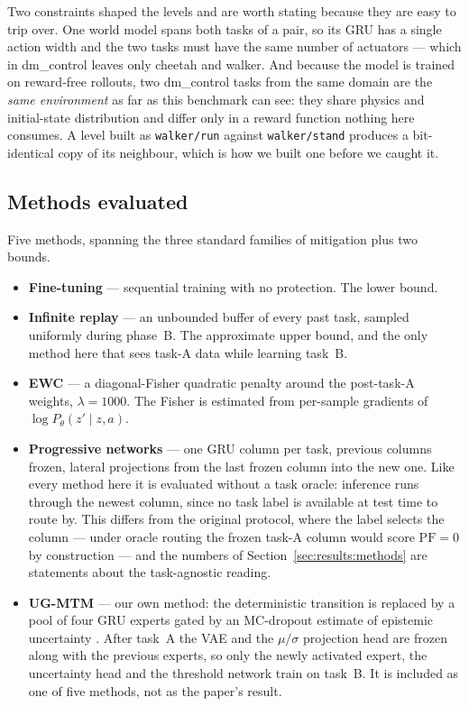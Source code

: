 Two constraints shaped the levels and are worth stating because they are easy to
trip over. One world model spans both tasks of a pair, so its GRU has a single
action width and the two tasks must have the same number of actuators --- which
in dm\_control leaves only cheetah and walker. And because the model is trained
on reward-free rollouts, two dm\_control tasks from the same domain are the
\emph{same environment} as far as this benchmark can see: they share physics and
initial-state distribution and differ only in a reward function nothing here
consumes. A level built as \texttt{walker/run} against \texttt{walker/stand}
produces a bit-identical copy of its neighbour, which is how we built one before
we caught it.

\subsection{Methods evaluated}
\label{sec:method:methods}

Five methods, spanning the three standard families of mitigation plus two
bounds.

\begin{itemize}
  \item \textbf{Fine-tuning} --- sequential training with no protection. The
  lower bound.
  \item \textbf{Infinite replay} --- an unbounded buffer of every past task,
  sampled uniformly during phase~B. The approximate upper bound, and the only
  method here that sees task-A data while learning task~B.
  \item \textbf{EWC} \citep{kirkpatrick2017ewc} --- a diagonal-Fisher quadratic
  penalty around the post-task-A weights, $\lambda = 1000$. The Fisher is
  estimated from per-sample gradients of $\log P_\theta(z' \mid z, a)$.
  \item \textbf{Progressive networks} \citep{rusu2016progressive} --- one GRU
  column per task, previous columns frozen, lateral projections from the last
  frozen column into the new one. Like every method here it is evaluated
  without a task oracle: inference runs through the newest column, since no
  task label is available at test time to route by. This differs from the
  original protocol, where the label selects the column --- under oracle
  routing the frozen task-A column would score $\mathrm{PF} = 0$ by
  construction --- and the numbers of
  Section~\ref{sec:results:methods} are statements about the task-agnostic
  reading.
  \item \textbf{UG-MTM} --- our own method: the deterministic transition is
  replaced by a pool of four GRU experts \citep{shazeer2017moe} gated by an
  MC-dropout estimate of epistemic uncertainty \citep{gal2016dropout}. After
  task~A the VAE and the $\mu/\sigma$ projection head are frozen along with the
  previous experts, so only the newly activated expert, the uncertainty head
  and the threshold network train on task~B. It is included as one of five
  methods, not as the paper's result.
\end{itemize}

